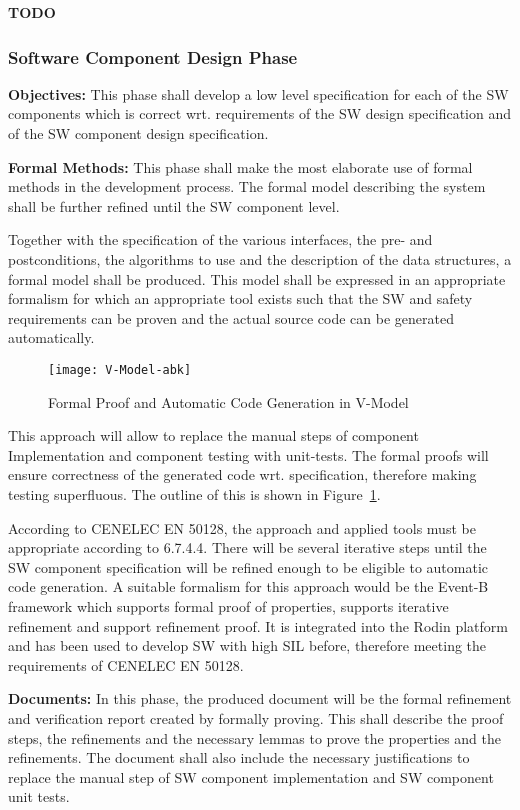 {\Huge \bf TODO}

\subsubsection{Software Component Design Phase}
\label{sec:softw-comp-design}

{\bf Objectives:} This phase shall develop a low level specification for each of
the SW components which is correct wrt. requirements of the SW design
specification and of the SW component design specification.

{\bf Formal Methods:} This phase shall make the most elaborate use of formal
methods in the development process. The formal model describing the system shall
be further refined until the SW component level.

Together with the specification of the various interfaces, the pre- and
postconditions, the algorithms to use and the description of the data
structures, a formal model shall be produced. This model shall be expressed in
an appropriate formalism for which an appropriate tool exists such that the SW
and safety requirements can be proven and the actual source code can be
generated automatically.

\begin{figure}[ht]
  \centering
  \texttt{[image: V-Model-abk]}
  \caption{Formal Proof and Automatic Code Generation in V-Model}
  \label{fig:proof-code-generation}
\end{figure}

This approach will allow to replace the manual steps of component Implementation
and component testing with unit-tests. The formal proofs will ensure correctness
of the generated code wrt. specification, therefore making testing
superfluous. The outline of this is shown in
Figure~\ref{fig:proof-code-generation}.

According to CENELEC EN 50128, the approach and applied tools must be
appropriate according to 6.7.4.4. There will be several iterative steps until
the SW component specification will be refined enough to be eligible to
automatic code generation. A suitable formalism for this approach would be the
Event-B framework which supports formal proof of properties, supports iterative
refinement and support refinement proof. It is integrated into the Rodin
platform and has been used to develop SW with high SIL before, therefore meeting
the requirements of CENELEC EN 50128.

{\bf Documents:} In this phase, the produced document will be the formal
refinement and verification report created by formally proving. This shall
describe the proof steps, the refinements and the necessary lemmas to prove the
properties and the refinements. The document shall also include the necessary
justifications to replace the manual step of SW component implementation and SW
component unit tests.

